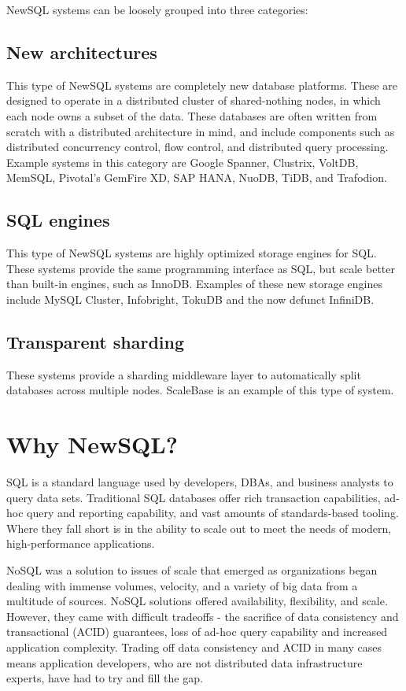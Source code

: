 \documentclass[12pt]{article}
\begin{document}
 NewSQL systems can be loosely grouped into three categories:
\subsection{New architectures}
This type of NewSQL systems are completely new database platforms. These are designed to operate in a distributed cluster of shared-nothing nodes, in which each node owns a subset of the data. These databases are often written from scratch with a distributed architecture in mind, and include components such as distributed concurrency control, flow control, and distributed query processing. Example systems in this category are Google Spanner, Clustrix, VoltDB, MemSQL, Pivotal's GemFire XD, SAP HANA, NuoDB, TiDB, and Trafodion.
\subsection{SQL engines}
This type of NewSQL systems are highly optimized storage engines for SQL. These systems provide the same programming interface as SQL, but scale better than built-in engines, such as InnoDB. Examples of these new storage engines include MySQL Cluster, Infobright, TokuDB and the now defunct InfiniDB.
\subsection{Transparent sharding}
These systems provide a sharding middleware layer to automatically split databases across multiple nodes. ScaleBase is an example of this type of system.
\section{Why NewSQL?}
SQL is a standard language used by developers, DBAs, and business analysts to query data sets. Traditional SQL databases offer rich transaction capabilities, ad-hoc query and reporting capability, and vast amounts of standards-based tooling. Where they fall short is in the ability to scale out to meet the needs of modern, high-performance applications.

NoSQL was a solution to issues of scale that emerged as organizations began dealing with immense volumes, velocity, and a variety of big data from a multitude of sources. NoSQL solutions offered availability, flexibility, and scale. However, they came with difficult tradeoffs - the sacrifice of data consistency and transactional (ACID) guarantees, loss of ad-hoc query capability and increased application complexity. Trading off data consistency and ACID in many cases means application developers, who are not distributed data infrastructure experts, have had to try and fill the gap.
\end{document}
